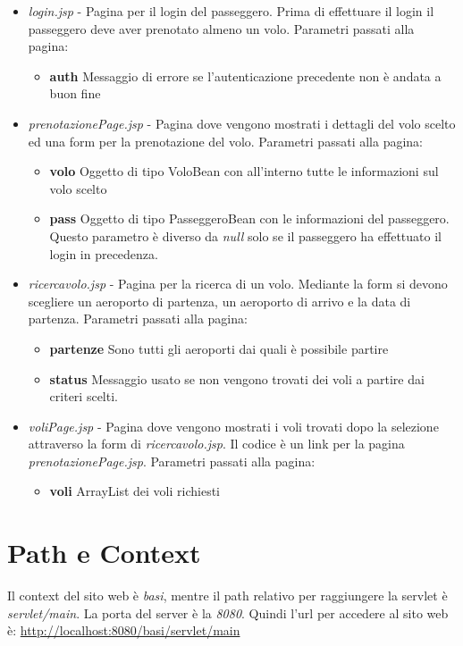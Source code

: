 \documentclass[a4paper,10pt]{article}
\begin{document}
\begin{itemize}
 \item \textit{login.jsp} - Pagina per il login del passeggero. Prima di effettuare il login il passeggero deve aver prenotato almeno un volo.
			Parametri passati alla pagina:
			\begin{itemize}
			 \item \textbf{auth} Messaggio di errore se l'autenticazione precedente non \`e andata a buon fine
			\end{itemize}
			
 \item \textit{prenotazionePage.jsp} - Pagina dove vengono mostrati i dettagli del volo scelto ed una form per la prenotazione del volo.
 			Parametri passati alla pagina:
			\begin{itemize}
			 \item \textbf{volo} Oggetto di tipo VoloBean con all'interno tutte le informazioni sul volo scelto
			 \item \textbf{pass} Oggetto di tipo PasseggeroBean con le informazioni del passeggero. Questo parametro \`e diverso da \textit{null} 
				solo se il passeggero ha effettuato il login in precedenza.
			\end{itemize}
			
 \item \textit{ricercavolo.jsp} - Pagina per la ricerca di un volo. Mediante la form si devono scegliere un aeroporto di partenza, un aeroporto di arrivo e la data 
				 di partenza. 
 			Parametri passati alla pagina:
			\begin{itemize}
			 \item \textbf{partenze} Sono tutti gli aeroporti dai quali \`e possibile partire
			 \item \textbf{status} Messaggio usato se non vengono trovati dei voli a partire dai criteri scelti.
			\end{itemize}
			
 \item \textit{voliPage.jsp} - Pagina dove vengono mostrati i voli trovati dopo la selezione attraverso la form di \textit{ricercavolo.jsp}. Il codice \`e un link per la pagina \textit{prenotazionePage.jsp}.
 			Parametri passati alla pagina:
			\begin{itemize}
			\item \textbf{voli} ArrayList dei voli richiesti 
			\end{itemize}
\end{itemize}

\section{Path e Context}
Il context del sito web \`e \textit{basi}, mentre il path relativo per raggiungere la servlet \`e \textit{servlet/main}. La porta del server \`e la \textit{8080}.
Quindi l'url per accedere al sito web \`e: \url{http://localhost:8080/basi/servlet/main}
\end{document}
